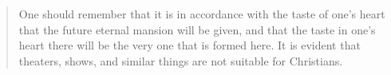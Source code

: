 \begin{quote}
  One should remember that it is in accordance with the taste of one's heart that the future eternal mansion will be given, and that the taste in one's heart there will be the very one that is formed here. It is evident that theaters, shows, and similar things are not suitable for Christians.
\end{quote}